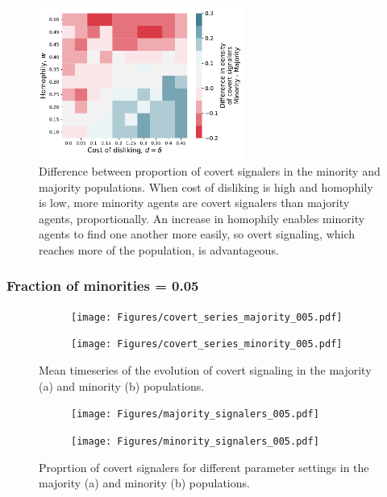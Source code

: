 \documentclass[11pt,letterpaper]{article}
\begin{document}
\begin{figure}[H]
  \centering
    \includegraphics[width=0.6\textwidth]{Figures/covert_signalers_diff_025.pdf}
  \caption{Difference between proportion of covert signalers in the minority 
    and majority populations. When cost of disliking is high and homophily is 
    low, more minority agents are covert signalers than majority agents,
    proportionally. An increase in homophily enables minority agents to 
    find one another more easily, so overt signaling, which reaches more of
    the population, is advantageous.
  }
  \label{fig:}
\end{figure}

\subsubsection{Fraction of minorities = 0.05}

\begin{figure}[H]
  \centering
  \begin{subfigure}{0.49\textwidth}
    \centering
    \texttt{[image: Figures/covert\_series\_majority\_005.pdf]}
    \caption{}
    \label{fig:}
  \end{subfigure}
  \begin{subfigure}{0.49\textwidth}
    \centering
    \texttt{[image: Figures/covert\_series\_minority\_005.pdf]}
    \caption{}
    \label{fig:}
  \end{subfigure}
  \caption{Mean timeseries of the evolution of covert signaling in the
    majority (a) and minority (b) populations.}
  \label{fig:regressions}
\end{figure}


\begin{figure}[H]
  \centering
  \begin{subfigure}{0.49\textwidth}
    \centering
    \texttt{[image: Figures/majority\_signalers\_005.pdf]}
    \caption{}
    \label{fig:}
  \end{subfigure}
  \begin{subfigure}{0.49\textwidth}
    \centering
    \texttt{[image: Figures/minority\_signalers\_005.pdf]}
    \caption{}
    \label{fig:}
  \end{subfigure}
  \caption{Proprtion of covert signalers for different parameter settings in the
    majority (a) and minority (b) populations.}
  \label{fig:regressions}
\end{figure}
\end{document}
